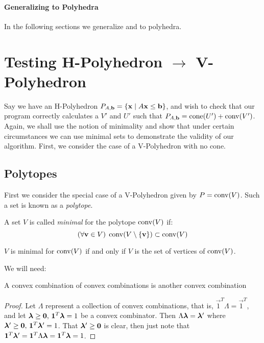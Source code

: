 \paragraph{\Large{Generalizing to Polyhedra}}

In the following sections we generalize  and  to polyhedra.

\section{Testing H-Polyhedron $\to$ V-Polyhedron}

Say we have an H-Polyhedron $P_{A,\mathbf{b}} = \left\{\mathbf{x}\;|\; A\mathbf{x}\leq \mathbf{b}\right\}$, and wish to check that our program correctly calculates a $V'$ and $U'$ such that $P_{A,\mathbf{b}} = \operatorname{cone}(U') + \operatorname{conv}(V')$.  Again, we shall use the notion of minimality and show that under certain circumstances we can use minimal sets to demonstrate the validity of our algorithm.  First, we consider the case of a V-Polyhedron with no cone.

\subsection{Polytopes}

First we consider the special case of a V-Polyhedron given by $P = \operatorname{conv}(V)$.  Such a set is known as a \textit{polytope}.

\drawVPolytope
\drawHPolytope

\begin{Def}
	A set $V$ is called \textit{minimal} for the polytope $\operatorname{conv}(V)$ if:
	\[(\forall \mathbf{v}\in V)\; \operatorname{conv}(V\setminus\left\{\mathbf{v}\right\}) \subset \operatorname{conv}(V)\]
\end{Def}

\begin{Prop}\label{min_conv}
	$V$ is minimal for $\operatorname{conv}(V)$ if and only if $V$ is the set of vertices of $\operatorname{conv}(V)$.
\end{Prop}

We will need:

\begin{Prop}\label{conv_conv}
	A convex combination of convex combinations is another convex combination
\end{Prop}

\begin{proof}
	Let $\Lambda$ represent a collection of convex combinations, that is, $\vec{1}^T\Lambda = \vec{1}^T$, and let $\bm{\lambda}\geq\mathbf{0},\,\mathbf{1}^T\bm{\lambda} = 1$ be a convex combinator.  Then $\Lambda\bm{\lambda} = \bm{\lambda}'$ where $\bm{\lambda}'\geq\mathbf{0},\,\mathbf{1}^T\bm{\lambda}'=1$.  That $\bm{\lambda}'\geq\mathbf{0}$ is clear, then just note that $\mathbf{1}^T\bm{\lambda}' = \mathbf{1}^T\Lambda\bm{\lambda} = \mathbf{1}^T\bm{\lambda} = 1$.
\end{proof}

